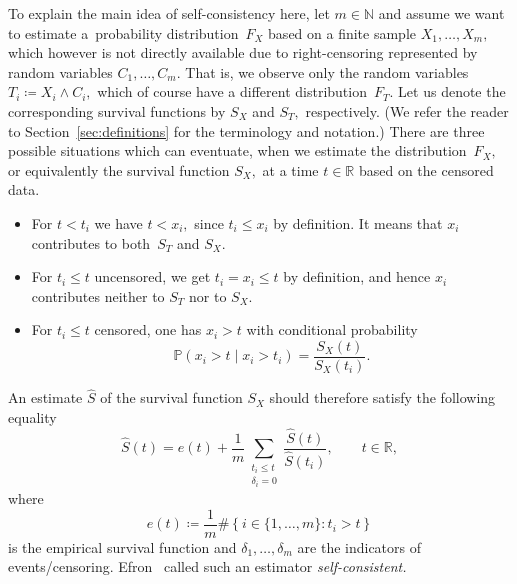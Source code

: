 \documentclass{amsart}
\theoremstyle{plain}
\theoremstyle{definition}
\def\l{\left}
\def\r{\right}
\def\as{\coloneqq}
\def\nat{\mathbb{N}}
\def\rls{\mathbb{R}}
\newcommand{\rec}[1]{\frac{1}{#1}}
\def\col{\colon}
\renewcommand{\hat}{\widehat}
\def\prob{\mathbb{P}}
\begin{document}
To explain the main idea of self-consistency here, let $m\in\nat$ and assume we want to estimate a~probability distribution~$F_X$ based on a finite sample $X_1,\dots, X_m,$ which however is not directly available due to right-censoring represented by random variables $C_1,\dots, C_m.$ That is, we observe only the random variables $T_i\as X_i\wedge C_i,$ which of course have a different distribution~$F_T.$ Let us denote the corresponding survival functions by $S_X$ and $S_T,$ respectively. (We refer the reader to Section~\ref{sec:definitions} for the terminology and notation.) There are three possible situations which can eventuate, when we estimate the distribution~$F_X,$ or equivalently the survival function $S_X,$ at a time $t\in\rls$ based on the censored data.
\begin{itemize}
\item For $t < t_i$ we have $t<x_i,$ since $t_i\le x_i$ by definition. It means that $x_i$ contributes to both~$S_T$ and $S_X.$
 
\item For $t_i \le t$ uncensored, we get $t_i=x_i\le t$ by definition, and hence $x_i$ contributes neither to $S_T$ nor to $S_X.$

\item For $t_i \le t$ censored, one has $x_i > t$ with conditional probability
\begin{equation*}
 \prob\l(x_i > t \mid x_i>t_i  \r) = \frac{S_X(t)}{S_X\l(t_i\r)}.
\end{equation*}
\end{itemize}
An estimate $\hat{S}$ of the survival function $S_X$ should therefore satisfy the following equality
\begin{equation} \label{eq:self}
 \hat{S}(t) = e(t) + \rec{m} \sum_{\substack{t_i\le t \\ \delta_i=0}}\frac{\hat{S}(t)}{\hat{S}\l(t_i\r)},\qquad t\in\rls,
\end{equation}
where
\begin{equation*}
 e(t)\as\rec{m} \#\l\{i\in\{1,\dots,m\}\col t_i > t  \r\}
\end{equation*}
is the empirical survival function and $\delta_1,\dots,\delta_m$ are the indicators of events/censoring. Efron~\cite{efron} called such an estimator \emph{self-consistent.} 
\end{document}

